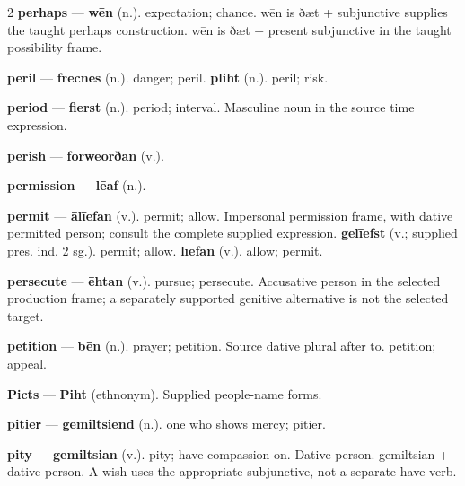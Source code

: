 \begin{multicols}{2}
\textbf{perhaps} — \textbf{wēn} (n.). expectation; chance. wēn is ðæt + subjunctive supplies the taught perhaps construction. wēn is ðæt + present subjunctive in the taught possibility frame.\par
\textbf{peril} — \textbf{frēcnes} (n.). danger; peril. \textbf{pliht} (n.). peril; risk.\par
\textbf{period} — \textbf{fierst} (n.). period; interval. Masculine noun in the source time expression.\par
\textbf{perish} — \textbf{forweorðan} (v.).\par
\textbf{permission} — \textbf{lēaf} (n.).\par
\textbf{permit} — \textbf{ālīefan} (v.). permit; allow. Impersonal permission frame, with dative permitted person; consult the complete supplied expression. \textbf{gelīefst} (v.; supplied pres. ind. 2 sg.). permit; allow. \textbf{līefan} (v.). allow; permit.\par
\textbf{persecute} — \textbf{ēhtan} (v.). pursue; persecute. Accusative person in the selected production frame; a separately supported genitive alternative is not the selected target.\par
\textbf{petition} — \textbf{bēn} (n.). prayer; petition. Source dative plural after tō. petition; appeal.\par
\textbf{Picts} — \textbf{Piht} (ethnonym). Supplied people-name forms.\par
\textbf{pitier} — \textbf{gemiltsiend} (n.). one who shows mercy; pitier.\par
\textbf{pity} — \textbf{gemiltsian} (v.). pity; have compassion on. Dative person. gemiltsian + dative person. A wish uses the appropriate subjunctive, not a separate have verb.\par

\end{multicols}
